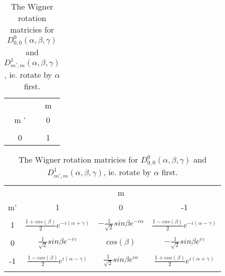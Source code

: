 \documentclass[10pt]{article}
\begin{document}
\begin{table}[!htbp]
\centering
\hspace{9mm}
\begin{minipage}{0.1\linewidth}
\begin{tabular}{c c }
\hline
&m \\
m \' & 0 \\
\hline
\\

0& 1\\

\hline
\end{tabular}
\end{minipage}
\hspace{9mm}
\begin{minipage}{0.5\linewidth}
\begin{tabular}{c c c c}
\hline
&&m& \\
m\' & 1 & 0 & -1\\
\hline
\\
1&$\frac{1 + cos(\beta)}{2}e^{-i(\alpha + \gamma)}$&$ -\frac{1}{\sqrt{2}}sin\beta e^{-i\alpha}$&$ \frac{1 - cos(\beta)}{2}e^{-i(\alpha - \gamma)}$\\
\\
0&$ \frac{1}{\sqrt{2}}sin\beta e^{-i\gamma}$&$ cos(\beta)$& $-\frac{1}{\sqrt{2}}sin\beta e^{i\gamma}$\\
\\
-1&$\frac{1 - cos(\beta)}{2}e^{i(\alpha - \gamma)}$&$ \frac{1}{\sqrt{2}}sin\beta e^{i\alpha}$&$ \frac{1 + cos(\beta)}{2}e^{i(\alpha + \gamma)}$\\
\\
\hline
\end{tabular}

\end{minipage}
\label{wigner}
\caption{The Wigner rotation matricies for $D^0_{0,0}(\alpha,\beta,\gamma)$ and $D^1_{m',m}(\alpha,\beta,\gamma)$, ie. rotate by $\alpha$ first.}
\end{table}
 
\end{document}

